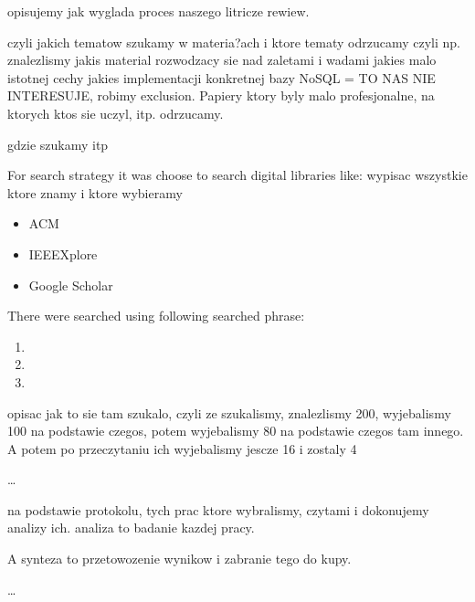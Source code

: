 \documentclass[times, 10pt,twocolumn]{article}
\begin{document}
opisujemy jak wyglada proces naszego litricze rewiew.


czyli jakich tematow szukamy w materia?ach
i ktore tematy odrzucamy
czyli np. znalezlismy jakis material rozwodzacy sie nad zaletami i wadami jakies malo istotnej cechy jakies implementacji konkretnej bazy NoSQL = TO NAS NIE INTERESUJE, robimy exclusion. 
Papiery ktory byly malo profesjonalne, na ktorych ktos sie uczyl, itp. odrzucamy.


gdzie szukamy itp

For search strategy it was choose to search digital libraries like:
wypisac wszystkie ktore znamy i ktore wybieramy
\begin{itemize}
	\item ACM
	\item IEEEXplore
	\item Google Scholar
\end{itemize}

There were searched using following searched phrase:
\begin{enumerate}
	\item 
	\item
	\item
\end{enumerate}



opisac jak to sie tam szukalo, czyli ze szukalismy, znalezlismy 200,
wyjebalismy 100 na podstawie czegos, potem wyjebalismy 80 na podstawie 
czegos tam innego. A potem po przeczytaniu ich wyjebalismy jescze 16 i zostaly
4

\ldots



na podstawie protokolu, tych prac ktore wybralismy, czytami i dokonujemy analizy ich.
analiza to badanie kazdej pracy.


A synteza to przetowozenie wynikow i zabranie tego do kupy.

\ldots

\end{document}
